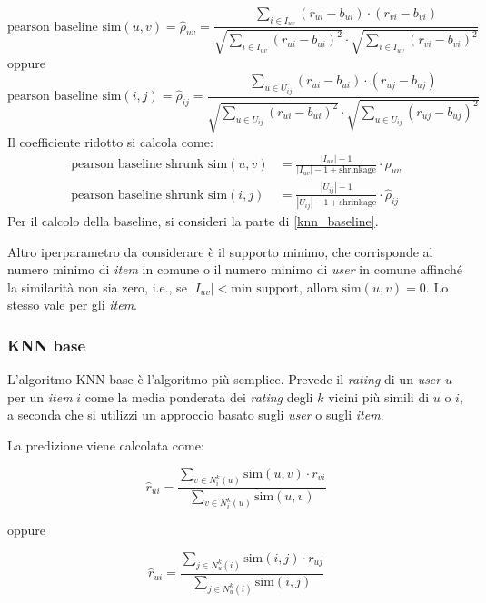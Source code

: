 \begin{itemize}
        \[
        \text{pearson baseline sim}(u, v) = \hat{\rho}_{uv} = \frac{\sum\limits_{i \in I_{uv}} (r_{ui} - b_{ui}) \cdot (r_{vi} - b_{vi})}{\sqrt{\sum\limits_{i \in I_{uv}} (r_{ui} - b_{ui})^2} \cdot \sqrt{\sum\limits_{i \in I_{uv}} (r_{vi} - b_{vi})^2}}
        \]
        oppure
        \[
        \text{pearson baseline sim}(i, j) = \hat{\rho}_{ij} = \frac{\sum\limits_{u \in U_{ij}} (r_{ui} - b_{ui}) \cdot (r_{uj} - b_{uj})}{\sqrt{\sum\limits_{u \in U_{ij}} (r_{ui} - b_{ui})^2} \cdot \sqrt{\sum\limits_{u \in U_{ij}} (r_{uj} - b_{uj})^2}}
        \]
        Il coefficiente ridotto si calcola come:
        \begin{align*}
            \text{pearson baseline shrunk sim}(u, v) &= \frac{|I_{uv}| - 1}{|I_{uv}| - 1 + \text{shrinkage}} \cdot \hat{\rho}_{uv} \\
            \text{pearson baseline shrunk sim}(i, j) &= \frac{|U_{ij}| - 1}{|U_{ij}| - 1 + \text{shrinkage}} \cdot \hat{\rho}_{ij}
        \end{align*}
        Per il calcolo della baseline, si consideri la parte di \ref{knn_baseline}.
\end{itemize}

Altro iperparametro da considerare è il supporto minimo, che corrisponde al numero minimo di \textit{item} in comune o il numero minimo di \textit{user} in comune affinché la similarità non sia zero, i.e., se $|I_{uv}| < \text{min support}$, allora $\text{sim}(u, v) = 0$. Lo stesso vale per gli \textit{item}.

\subsubsection{KNN base}

L'algoritmo KNN base è l'algoritmo più semplice. Prevede il  \textit{rating} di un \textit{user} $u$ per un \textit{item} $i$ come la media ponderata dei \textit{rating} degli $k$ vicini più simili di $u$ o $i$, a seconda che si utilizzi un approccio basato sugli \textit{user} o sugli \textit{item}.

La predizione viene calcolata come:

\[
\hat{r}_{ui} = \frac{\sum\limits_{v \in N^k_i(u)} \text{sim}(u, v) \cdot r_{vi}}{\sum\limits_{v \in N^k_i(u)} \text{sim}(u, v)}
\]

oppure

\[
\hat{r}_{ui} = \frac{\sum\limits_{j \in N^k_u(i)} \text{sim}(i, j) \cdot r_{uj}}{\sum\limits_{j \in N^k_u(i)} \text{sim}(i, j)}
\]

